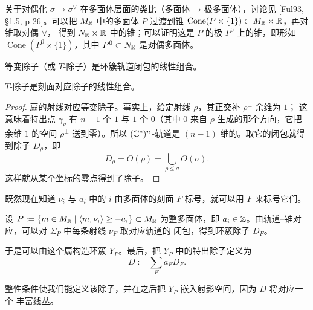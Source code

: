 \begin{remark}
关于对偶化 $\sigma\to\sigma^\vee$ 在多面体层面的类比（多面体 → 极多面体），讨论见
[Ful93, §1.5, p 26]。可以把 $M_{\mathbb{R}}$ 中的多面体 $P$ 过渡到锥
$\operatorname{Cone}(P\times\{1\})\subset M_{\mathbb{R}}\times\mathbb{R}$，再对锥取对偶 $\vee$，
得到 $N_{\mathbb{R}}\times\mathbb{R}$ 中的锥；可以证明这是 $P$ 的极 $P^0$ 上的锥，即形如
$\operatorname{Cone}(P^0\times\{1\})$，其中 $P^0\subset N_{\mathbb{R}}$ 是对偶多面体。
\end{remark}


\begin{definition}[等变除子]
等变除子（或 $T$-除子）是环簇轨道闭包的线性组合。
\end{definition}

\begin{claim}
$T$-除子是刻面对应除子的线性组合。
\end{claim}

\begin{proof}
扇的射线对应等变除子。事实上，给定射线 $\rho$，其正交补 $\rho^\perp$ 余维为 $1$；
这意味着特出点 $\gamma_\rho$ 有 $n-1$ 个 $1$ 与 $1$ 个 $0$（其中 $0$ 来自 $\rho$
生成的那个方向，它把余维 $1$ 的空间 $\rho^\perp$ 送到零）。所以 $(\mathbb{C}^*)^n$-轨道是
$(n-1)$ 维的。取它的闭包就得到除子 $D_\rho$，即
\[
D_\rho = \overline{O(\rho)} = \bigcup_{\rho\le\sigma} O(\sigma).
\]
这样就从某个坐标的零点得到了除子。
\end{proof}

\begin{remark}[记号]
既然现在知道 $\nu_i$ 与 $a_i$ 中的 $i$ 由多面体的刻面 $F$ 标号，就可以用 $F$
来标号它们。
\end{remark}

\begin{definition}[特出除子]
设 $P := \{m\in M_{\mathbb{R}}\mid \langle m,\nu_i\rangle\ge -a_i\}\subset M_{\mathbb{R}}$ 为整多面体，即
$a_i\in\mathbb{Z}$。由轨道–锥对应，可以对 $\Sigma_P$ 中每条射线 $\nu_F$ 取对应轨道的
闭包，得到环簇除子 $D_F$。
\end{definition}

于是可以由这个扇构造环簇 $Y_P$。最后，把 $Y_P$ 中的特出除子定义为
\[
D := \sum_F a_F D_F.
\]

\begin{remark}
整性条件使我们能定义该除子，并在之后把 $Y_P$ 嵌入射影空间，因为 $D$ 将对应一个
丰富线丛。
\end{remark}


